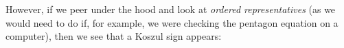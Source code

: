 However, if we peer under the hood and look at {\it ordered representatives} (as we would need to do if, for example,
we were checking the pentagon equation on a computer), then we
see that a Koszul sign appears:

